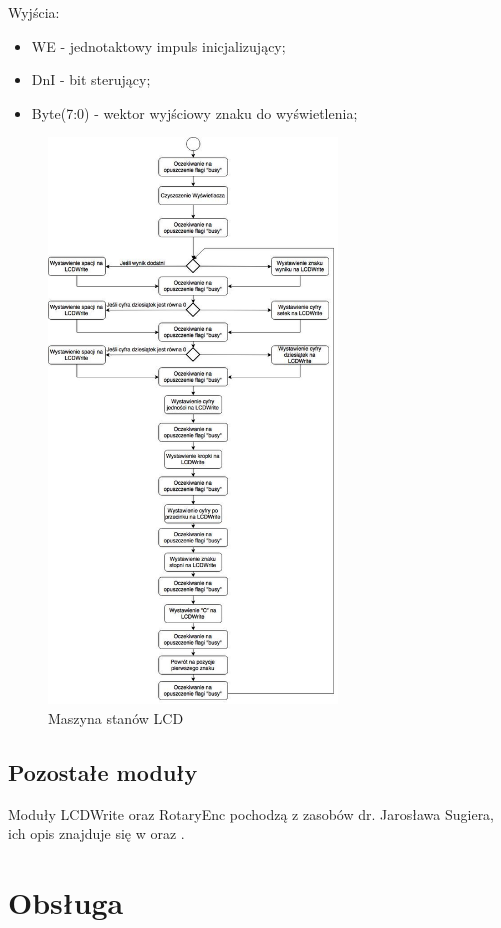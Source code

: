 \documentclass[a4paper]{article}
\begin{document}
Wyjścia:
\begin{itemize}
\item WE - jednotaktowy impuls inicjalizujący; 
\item DnI - bit sterujący;
\item Byte(7:0) - wektor wyjściowy znaku do wyświetlenia;
\end{itemize}

\begin{figure}[H]
\begin{center}
\includegraphics[height=15cm]{graphics/lcd_fsm.png}
\end{center}
\caption{Maszyna stanów LCD}
\label{lcd_fsm}
\end{figure}

\subsection{Pozostałe moduły}

Moduły LCDWrite oraz RotaryEnc pochodzą z zasobów dr. Jarosława Sugiera, ich opis znajduje się w \cite{bib_lcdwrite} oraz \cite{bib_rotaryenc}.

\section{Obsługa}
\end{document}
